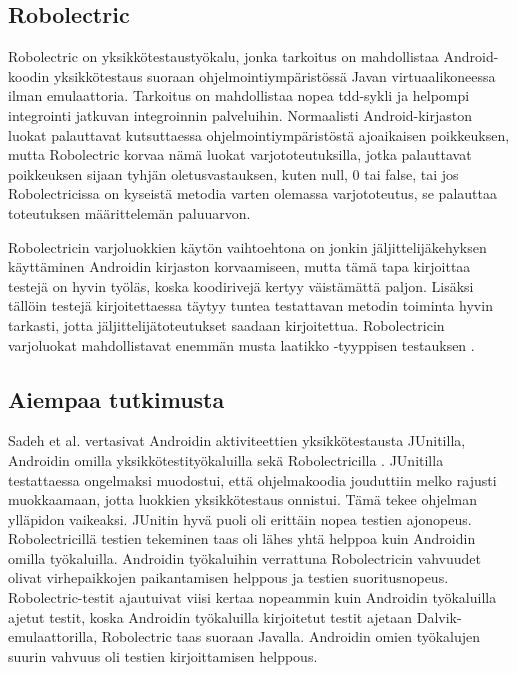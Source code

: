 \subsection{Robolectric}

Robolectric on yksikkötestaustyökalu, jonka tarkoitus on mahdollistaa Android-koodin yksikkötestaus suoraan ohjelmointiympäristössä Javan virtuaalikoneessa ilman emulaattoria. Tarkoitus on mahdollistaa nopea tdd-sykli ja helpompi integrointi jatkuvan integroinnin palveluihin. Normaalisti Android-kirjaston luokat palauttavat kutsuttaessa ohjelmointiympäristöstä ajoaikaisen poikkeuksen, mutta Robolectric korvaa nämä luokat varjototeutuksilla, jotka palauttavat poikkeuksen sijaan tyhjän oletusvastauksen, kuten null, 0 tai false, tai jos Robolectricissa on kyseistä metodia varten olemassa varjototeutus, se palauttaa toteutuksen määrittelemän paluuarvon.

Robolectricin varjoluokkien käytön vaihtoehtona on jonkin jäljittelijäkehyksen käyttäminen Androidin kirjaston korvaamiseen, mutta tämä tapa kirjoittaa testejä on hyvin työläs, koska koodirivejä kertyy väistämättä paljon. Lisäksi tällöin testejä kirjoitettaessa täytyy tuntea testattavan metodin toiminta hyvin tarkasti, jotta jäljittelijätoteutukset saadaan kirjoitettua. Robolectricin varjoluokat mahdollistavat enemmän musta laatikko -tyyppisen testauksen \cite{robolectric}.

\subsection{Aiempaa tutkimusta}

Sadeh et al. vertasivat Androidin aktiviteettien yksikkötestausta JUnitilla, Androidin omilla yksikkötestityökaluilla sekä Robolectricilla \cite{sadehetal11}. JUnitilla testattaessa ongelmaksi muodostui, että ohjelmakoodia jouduttiin melko rajusti muokkaamaan, jotta luokkien yksikkötestaus onnistui. Tämä tekee ohjelman ylläpidon vaikeaksi. JUnitin hyvä puoli oli erittäin nopea testien ajonopeus. Robolectricillä testien tekeminen taas oli lähes yhtä helppoa kuin Androidin omilla työkaluilla. Androidin työkaluihin verrattuna Robolectricin vahvuudet olivat virhepaikkojen paikantamisen helppous ja testien suoritusnopeus. Robolectric-testit ajautuivat viisi kertaa nopeammin kuin Androidin työkaluilla ajetut testit, koska Androidin työkaluilla kirjoitetut testit ajetaan Dalvik-emulaattorilla, Robolectric taas suoraan Javalla. Androidin omien työkalujen suurin vahvuus oli testien kirjoittamisen helppous.


